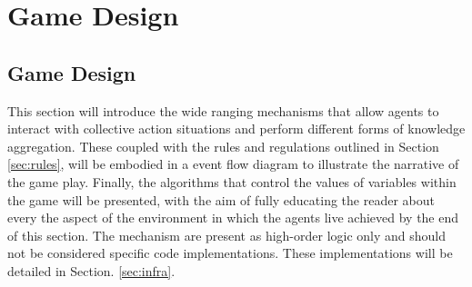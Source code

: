 \chapter{Game Design}\label{game design}






\section{Game Design}\label{sec: game design}

This section will introduce the wide ranging mechanisms that allow agents to interact with collective action situations and perform different forms of knowledge aggregation. These coupled with the rules and regulations outlined in Section \ref{sec:rules}, will be embodied in a event flow diagram to illustrate the narrative of the game play. Finally, the algorithms that control the values of variables within the game will be presented, with the aim of fully educating the reader about every the aspect of the environment in which the agents live achieved by the end of this section. The mechanism are present as high-order logic only and should not be considered specific code implementations. These implementations will be detailed in Section. \ref{sec:infra}.


